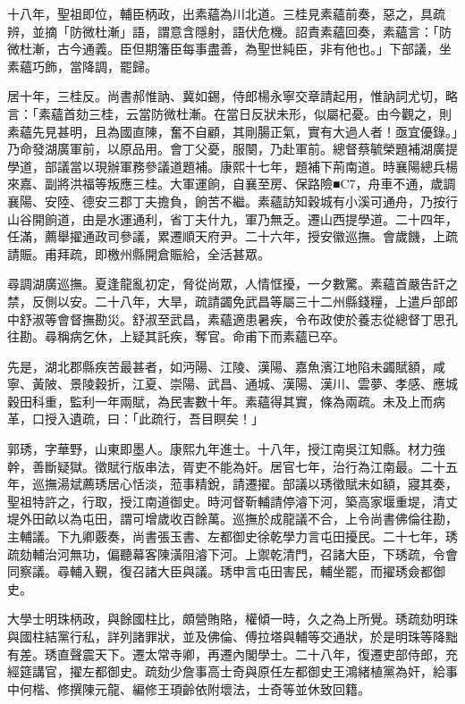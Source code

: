 \begin{pinyinscope}
十八年，聖祖即位，輔臣柄政，出素蘊為川北道。三桂見素蘊前奏，惡之，具疏辨，並摘「防微杜漸」語，謂意含隱射，語伏危機。詔責素蘊回奏，素蘊言：「防微杜漸，古今通義。臣但期籓臣每事盡善，為聖世純臣，非有他也。」下部議，坐素蘊巧飾，當降調，罷歸。

居十年，三桂反。尚書郝惟訥、冀如錫，侍郎楊永寧交章請起用，惟訥詞尤切，略言：「素蘊首劾三桂，云當防微杜漸。在當日反狀未形，似屬杞憂。由今觀之，則素蘊先見甚明，且為國直陳，奮不自顧，其剛腸正氣，實有大過人者！亟宜優錄。」乃命發湖廣軍前，以原品用。會丁父憂，服闋，乃赴軍前。總督蔡毓榮題補湖廣提學道，部議當以現辦軍務參議道題補。康熙十七年，題補下荊南道。時襄陽總兵楊來嘉、副將洪福等叛應三桂。大軍運餉，自襄至房、保路險■C7，舟車不通，歲調襄陽、安陸、德安三郡丁夫擔負，餉苦不繼。素蘊訪知穀城有小溪可通舟，乃按行山谷開餉道，由是水運通利，省丁夫什九，軍乃無乏。遷山西提學道。二十四年，任滿，薦舉擢通政司參議，累遷順天府尹。二十六年，授安徽巡撫。會歲饑，上疏請賑。甫拜疏，即檄州縣開倉賑給，全活甚眾。

尋調湖廣巡撫。夏逢龍亂初定，脅從尚眾，人情恇擾，一夕數驚。素蘊首嚴告訐之禁，反側以安。二十八年，大旱，疏請蠲免武昌等屬三十二州縣錢糧，上遣戶部郎中舒淑等會督撫勘災。舒淑至武昌，素蘊適患暑疾，令布政使於養志從總督丁思孔往勘。尋稱病乞休，上疑其託疾，奪官。命甫下而素蘊已卒。

先是，湖北郡縣疾苦最甚者，如沔陽、江陵、漢陽、嘉魚濱江地陷未蠲賦額，咸寧、黃陂、景陵穀折，江夏、崇陽、武昌、通城、漢陽、漢川、雲夢、孝感、應城穀田科重，監利一年兩賦，為民害數十年。素蘊得其實，條為兩疏。未及上而病革，口授入遺疏，曰：「此疏行，吾目瞑矣！」

郭琇，字華野，山東即墨人。康熙九年進士。十八年，授江南吳江知縣。材力強幹，善斷疑獄。徵賦行版串法，胥吏不能為奸。居官七年，治行為江南最。二十五年，巡撫湯斌薦琇居心恬淡，蒞事精銳，請遷擢。部議以琇徵賦未如額，寢其奏，聖祖特許之，行取，授江南道御史。時河督靳輔請停濬下河，築高家堰重堤，清丈堤外田畝以為屯田，謂可增歲收百餘萬。巡撫於成龍議不合，上令尚書佛倫往勘，主輔議。下九卿覈奏，尚書張玉書、左都御史徐乾學力言屯田擾民。二十七年，琇疏劾輔治河無功，偏聽幕客陳潢阻濬下河。上禦乾清門，召諸大臣，下琇疏，令會同察議。尋輔入覲，復召諸大臣與議。琇申言屯田害民，輔坐罷，而擢琇僉都御史。

大學士明珠柄政，與餘國柱比，頗營賄賂，權傾一時，久之為上所覺。琇疏劾明珠與國柱結黨行私，詳列諸罪狀，並及佛倫、傅拉塔與輔等交通狀，於是明珠等降黜有差。琇直聲震天下。遷太常寺卿，再遷內閣學士。二十八年，復遷吏部侍郎，充經筵講官，擢左都御史。疏劾少詹事高士奇與原任左都御史王鴻緒植黨為奸，給事中何楷、修撰陳元龍、編修王頊齡依附壞法，士奇等並休致回籍。


\end{pinyinscope}
